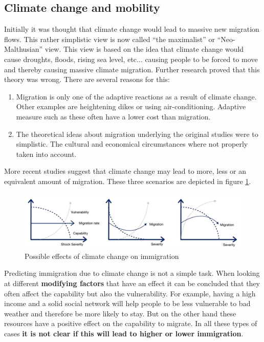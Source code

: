 \documentclass[../summary.tex]{subfiles}
\begin{document}
	
	\subsection{Climate change and mobility}
	Initially it was thought that climate change would lead to massive new migration flows. This rather simplistic view is now called ``the maximalist'' or ``Neo-Malthusian'' view. This view is based on the idea that climate change would cause droughts, floods, rising sea level, etc... causing people to be forced to move and thereby causing massive climate migration. Further research proved that this theory was wrong. There are several reasons for this: 
	\begin{enumerate}
		\item Migration is only one of the adaptive reactions as a result of climate change. Other examples are heightening dikes or using air-conditioning. Adaptive measure such as these often have a lower cost than migration.
		\item The theoretical ideas about migration underlying the original studies were to simplistic. The cultural and economical circumstances where not properly taken into account. 
	\end{enumerate}
	More recent studies suggest that climate change may lead to more, less or an equivalent amount of migration. These three scenarios are depicted in figure \ref{fig:7-climate-change}.
	\begin{figure}[h]
		\centering
		\includegraphics[width=0.7\linewidth]{../images/7-climate-change}
		\caption{Possible effects of climate change on immigration}
		\label{fig:7-climate-change}
	\end{figure}
	Predicting immigration due to climate change is not a simple task. When looking at different \textbf{modifying factors} that have an effect it can be concluded that they often affect the capability but also the vulnerability. For example, having a high income and a solid social network will help people to be less vulnerable to bad weather and therefore be more likely to stay. But on the other hand these resources have a positive effect on the capability to migrate. In all these types of cases \textbf{it is not clear if this will lead to higher or lower immigration}.
	
\end{document}
